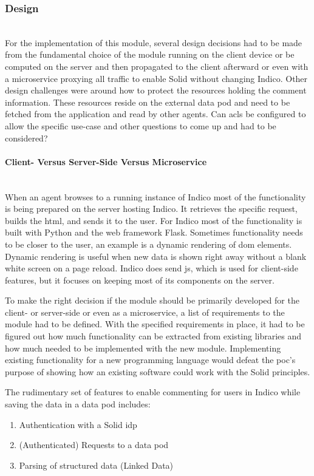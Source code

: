\subsubsection{Design}\label{subsubsection:design}\mbox{}\\

For the implementation of this module, several design decisions had to be made from the fundamental choice of the module running on the client device or be computed on the server and then propagated to the client afterward or even with a microservice proxying all traffic to enable Solid without changing Indico.
Other design challenges were around how to protect the resources holding the comment information. These resources reside on the external data pod and need to be fetched from the application and read by other agents. Can \glspl{acl} be configured to allow the specific use-case and other questions to come up and had to be considered?
\vspace{0.5cm}
\paragraph{Client- Versus Server-Side Versus Microservice}\mbox{}\\

When an agent browses to a running instance of Indico most of the functionality is being prepared on the server hosting Indico. It retrieves the specific request, builds the \gls{html}, and sends it to the user. For Indico most of the functionality is built with Python and the web framework Flask. Sometimes functionality needs to be closer to the user, an example is a dynamic rendering of \gls{dom} elements. Dynamic rendering is useful when new data is shown right away without a blank white screen on a page reload. Indico does send \gls{js}, which is used for client-side features, but it focuses on keeping most of its components on the server.

To make the right decision if the module should be primarily developed for the client- or server-side or even as a microservice, a list of requirements to the module had to be defined. With the specified requirements in place, it had to be figured out how much functionality can be extracted from existing libraries and how much needed to be implemented with the new module. Implementing existing functionality for a new programming language would defeat the \gls{poc}’s purpose of showing how an existing software could work with the Solid principles.

The rudimentary set of features to enable commenting for users in Indico while saving the data in a data pod includes: 
\begin{enumerate}
    \item Authentication with a Solid \gls{idp}
    \item (Authenticated) Requests to a data pod
    \item Parsing of structured data (Linked Data)
\end{enumerate}
\vspace{0.5cm}
